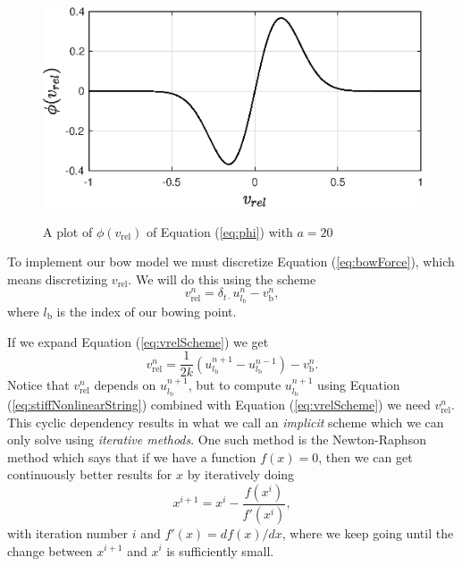 \documentclass{article}
\begin{document}
\begin{figure}[h]
  \includegraphics[width=\linewidth]{bowplot.eps}
  \label{fig:bowplot}
  \caption{A plot of $\phi(v_\text{rel})$ of Equation (\ref{eq:phi}) with $a = 20$}
\end{figure}
%
\noindent To implement our bow model we must discretize Equation (\ref{eq:bowForce}), which means discretizing $v_\text{rel}$.
We will do this using the scheme
\begin{equation}
  \label{eq:vrelScheme}
  v_\text{rel}^n = \delta_{t\cdot} u^n_{l_\text{b}} - v_\text{b}^n,
\end{equation}
where $l_\text{b}$ is the index of our bowing point.

If we expand Equation (\ref{eq:vrelScheme}) we get
\begin{equation}
  \label{eq:vrelSchemeExpanded}
  v_\text{rel}^n = \frac{1}{2k}\left(u^{n+1}_{l_\text{b}} - u^{n-1}_{l_\text{b}}\right) - v_\text{b}^n.
\end{equation}
Notice that $v_\text{rel}^n$ depends on $u^{n+1}_{l_\text{b}}$, but to compute $u^{n+1}_{l_\text{b}}$ using Equation (\ref{eq:stiffNonlinearString}) combined with Equation (\ref{eq:vrelScheme}) we need $v_\text{rel}^n$.
This cyclic dependency results in what we call an \textit{implicit} scheme which we can only solve using \textit{iterative methods}.
%
One such method is the Newton-Raphson method which says that if we have a function $f(x) = 0$, then we can get continuously better results for $x$ by iteratively doing
\begin{equation}
  x^{i+1} = x^i - \frac{f(x^i)}{f'(x^i)},
\end{equation}
with iteration number $i$ and $f'(x) = df(x)/dx$, where we keep going until the change between $x^{i+1}$ and $x^i$ is sufficiently small.
\end{document}
